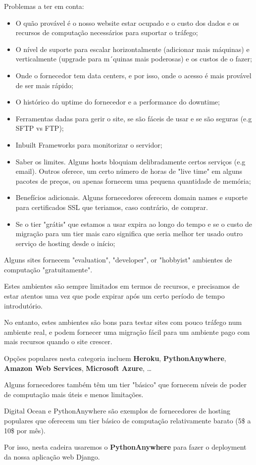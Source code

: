 \documentclass{article}
\begin{document}
\begin{flushleft}
  Problemas a ter em conta:
  \begin{itemize}
    \item O quão provável é o nosso website estar ocupado e o custo dos dados e
    os recursos de computação necessários para suportar o tráfego;
    \item O nível de suporte para escalar horizontalmente (adicionar mais máquinas)
    e verticalmente (upgrade para m´quinas mais poderosas) e os custos de o fazer;
    \item Onde o fornecedor tem data centers, e por isso, onde o acesso é mais provável de ser mais rápido;
    \item O histórico do uptime do fornecedor e a performance do downtime;
    \item Ferramentas dadas para gerir o site, se são fáceis de usar e se são seguras (e.g SFTP vs FTP);
    \item Inbuilt Frameworks para monitorizar o servidor;
    \item Saber os limites. Alguns hosts bloquiam delibradamente certos serviços (e.g email).
    Outros oferece, um certo número de horas de "live time" em alguns pacotes de preços, ou apenas
    fornecem uma pequena quantidade de memória;
    \item Benefícios adicionais. Alguns fornecedores oferecem domain names e suporte para certificados SSL
    que teriamos, caso contrário, de comprar.
    \item Se o tier "grátis" que estamos a usar expira ao longo do tempo e se o custo de migração
    para um tier mais caro significa que seria melhor ter usado outro serviço de hosting desde o início;
  \end{itemize}

  Alguns sites fornecem "evaluation", "developer", or "hobbyist" ambientes de computação
  "gratuitamente".

  Estes ambientes são sempre limitados em termos de recursos, e precisamos de estar atentos
  uma vez que pode expirar após um certo período de tempo introdutório.

  No entanto, estes ambientes são bons para testar sites com pouco tráfego num ambiente
  real, e podem fornecer uma migração fácil para um ambiente pago com mais recursos
  quando o site crescer.

  \pagebreak

  Opções populares nesta categoria incluem \textbf{Heroku}, \textbf{PythonAnywhere},
  \textbf{Amazon Web Services}, \textbf{Microsoft Azure}, \dots

  Alguns fornecedores também têm um tier "básico" que fornecem níveis de poder de computação
  mais úteis e menos limitações.

  Digital Ocean e PythonAnywhere são exemplos de fornecedores de hosting populares
  que oferecem um tier básico de computação relativamente barato (5\$ a 10\$ por mês).

  Por isso, nesta cadeira usaremos o \textbf{PythonAnywhere} para fazer o deployment
  da nossa aplicação web Django.
\end{flushleft}
\end{document}
